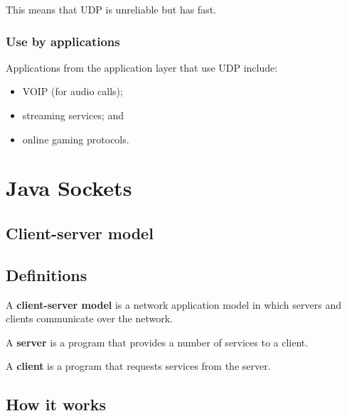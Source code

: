 \documentclass[a4paper]{systems-software}
\begin{document}
This means that UDP is unreliable but has fast.


\subsection*{Use by applications}

Applications from the application layer that use UDP include:
\begin{itemize}
	\item VOIP (for audio calls);
	\item streaming services; and
	\item online gaming protocols.
\end{itemize}


\chapter{Java Sockets}

\section{Client-server model}

\section*{Definitions}

A \textbf{client-server model} is a network application model in which servers and clients communicate over the network.

A \textbf{server} is a program that provides a number of services to a client.

A \textbf{client} is a program that requests services from the server.


\section*{How it works}
\end{document}
